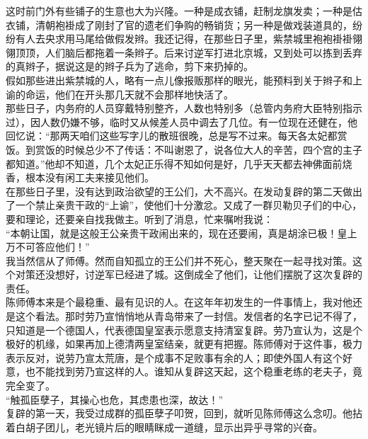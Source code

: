 这时前门外有些铺子的生意也大为兴隆。一种是成衣铺，赶制龙旗发卖；一种是估衣铺，清朝袍褂成了刚封了官的遗老们争购的畅销货；另一种是做戏装道具的，纷纷有人去央求用马尾给做假发辫。我还记得，在那些日子里，紫禁城里袍袍褂褂翎翎顶顶，人们脑后都拖着一条辫子。后来讨逆军打进北京城，又到处可以拣到丢弃的真辫子，据说这是的辫子兵为了逃命，剪下来扔掉的。\\

假如那些进出紫禁城的人，略有一点儿像报贩那样的眼光，能预料到关于辫子和上谕的命运，他们在开头那几天就不会那样地快活了。\\

那些日子，内务府的人员穿戴特别整齐，人数也特别多（总管内务府大臣特别指示过），因人数仍嫌不够，临时又从候差人员中调去了几位。有一位现在还健在，他回忆说：“那两天咱们这些写字儿的散班很晚，总是写不过来。每天各太妃都赏饭。到赏饭的时候总少不了传话：不叫谢恩了，说各位大人的辛苦，四个宫的主子都知道。”他却不知道，几个太妃正乐得不知如何是好，几乎天天都去神佛面前烧香，根本没有闲工夫来接见他们。\\

在那些日子里，没有达到政治欲望的王公们，大不高兴。在发动复辟的第二天做出了一个禁止亲贵干政的“上谕”，使他们十分激忿。又成了一群贝勒贝子们的中心，要和理论，还要亲自找我做主。听到了消息，忙来嘱咐我说：\\

“本朝让国，就是这般王公亲贵干政闹出来的，现在还要闹，真是胡涂已极！皇上万不可答应他们！”\\

我当然信从了师傅。然而自知孤立的王公们并不死心，整天聚在一起寻找对策。这个对策还没想好，讨逆军已经进了城。这倒成全了他们，让他们摆脱了这次复辟的责任。\\

陈师傅本来是个最稳重、最有见识的人。在这年年初发生的一件事情上，我对他还是这个看法。那时劳乃宣悄悄地从青岛带来了一封信。发信者的名字已记不得了，只知道是一个德国人，代表德国皇室表示愿意支持清室复辟。劳乃宣认为，这是个极好的机缘，如果再加上德清两皇室结亲，就更有把握。陈师傅对于这件事，极力表示反对，说劳乃宣太荒唐，是个成事不足败事有余的人；即使外国人有这个好意，也不能找到劳乃宣这样的人。谁知从复辟这天起，这个稳重老练的老夫子，竟完全变了。\\

“触孤臣孽子，其操心也危，其虑患也深，故达！”\\

复辟的第一天，我受过成群的孤臣孽子叩贺，回到，就听见陈师傅这么念叨。他拈着白胡子团儿，老光镜片后的眼睛眯成一道缝，显示出异乎寻常的兴奋。\\

